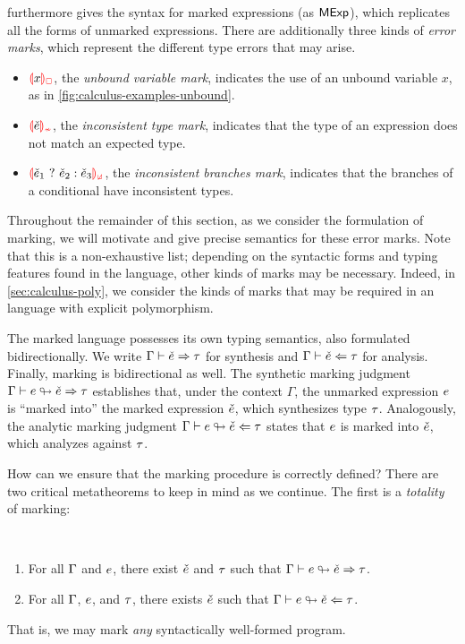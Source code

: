 
 furthermore gives the syntax for marked expressions (as ${\normalfont\textsf{MExp}}$),
which replicates all the forms of unmarked expressions. There are additionally three kinds of
\emph{error marks}, which represent the different type errors that may arise.
%
\begin{itemize}
  \item $\ECUnbound{x}$, the \emph{unbound variable mark}, indicates the use of an unbound variable
    $x$, as in \cref{fig:calculus-examples-unbound}.

  \item $\ECInconType{\ECMV}$, the \emph{inconsistent type mark}, indicates that the type of an
    expression does not match an expected type.

  \item $\ECInconBr{\ECMV_1}{\ECMV_2}{\ECMV_3}$, the \emph{inconsistent branches mark}, indicates
    that the branches of a conditional have inconsistent types.
\end{itemize}
%
Throughout the remainder of this section, as we consider the formulation of marking, we will
motivate and give precise semantics for these error marks. Note that this is a non-exhaustive list;
depending on the syntactic forms and typing features found in the language, other kinds of marks may
be necessary. Indeed, in \cref{sec:calculus-poly}, we consider the kinds of marks that may be
required in an language with explicit polymorphism.

The marked language possesses its own typing semantics, also formulated bidirectionally. We write
$\Gamma \vdash \check{e} \Rightarrow \tau$ for synthesis and $\Gamma \vdash \check{e} \Leftarrow \tau$ for analysis.
Finally, marking is bidirectional as well. The synthetic marking judgment
$\Gamma \vdash e \looparrowright \check{e} \Rightarrow \tau$ establishes that, under the context $\Gamma$, the
unmarked expression $e$ is ``marked into'' the marked expression $\check{e}$, which synthesizes type
$\tau$. Analogously, the analytic marking judgment $\Gamma \vdash e \looparrowright \check{e} \Leftarrow \tau$
states that $e$ is marked into $\check{e}$, which analyzes against $\tau$.

How can we ensure that the marking procedure is correctly defined? There are two critical
metatheorems to keep in mind as we continue. The first is a \emph{totality} of marking:
%
\begin{theorem}[name=Marking Totality] \
  \label{thm:calculus-marking-totality}
  \begin{enumerate}
    \item For all $\Gamma$ and $e$, there exist $\check{e}$ and $\tau$ such that
      $\Gamma \vdash e \looparrowright \check{e} \Rightarrow \tau$.
  \item For all $\Gamma$, $e$, and $\tau$, there exists $\check{e}$ such that
    $\Gamma \vdash e \looparrowright \check{e} \Leftarrow \tau$.
  \end{enumerate}
\end{theorem}
%
That is, we may mark \emph{any} syntactically well-formed program.

